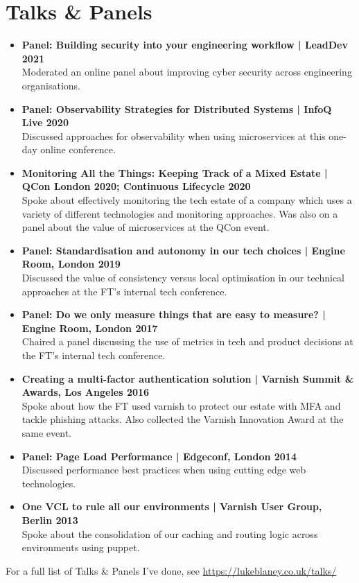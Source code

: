 \documentclass[a4paper]{article}
\begin{document}
\section*{Talks \& Panels}
\begin{itemize}

\item{\bf Panel: Building security into your engineering workflow | LeadDev 2021}\\
Moderated an online panel about improving cyber security across engineering organisations.
\item{\bf Panel: Observability Strategies for Distributed Systems | InfoQ Live 2020}\\
Discussed approaches for observability when using microservices at this one-day online conference.
\item{\bf Monitoring All the Things: Keeping Track of a Mixed Estate | QCon London 2020; Continuous Lifecycle 2020}\\
Spoke about effectively monitoring the tech estate of a company which uses a variety of different technologies and monitoring approaches.  Was also on a panel about the value of microservices at the QCon event.
\item{\bf Panel: Standardisation and autonomy in our tech choices | Engine Room, London 2019}\\
Discussed the value of consistency versus local optimisation in our technical approaches at the FT's internal tech conference.
\item{\bf Panel: Do we only measure things that are easy to measure? | Engine Room, London 2017}\\
Chaired a panel discussing the use of metrics in tech and product decisions at the FT's internal tech conference.
\item{\bf Creating a multi-factor authentication solution | Varnish Summit \& Awards, Los Angeles 2016}\\
Spoke about how the FT used varnish to protect our estate with MFA and tackle phishing attacks.  Also collected the Varnish Innovation Award at the same event.
\item{\bf Panel: Page Load Performance | Edgeconf, London 2014 }\\
Discussed performance best practices when using cutting edge web technologies.
\item{\bf One VCL to rule all our environments | Varnish User Group, Berlin 2013}\\
Spoke about the consolidation of our caching and routing logic across environments using puppet.
\end{itemize}
For a full list of Talks \& Panels I've done, see \url{https://lukeblaney.co.uk/talks/}
\end{document}
